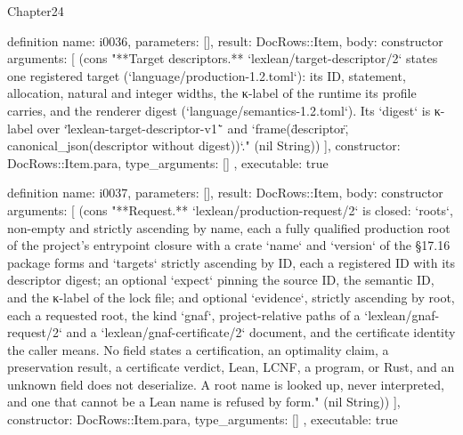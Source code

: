 \begin{lexlean}{Chapter24}
\begin{semanticmodule}
definition{
  name: i0036,
  parameters: [],
  result: DocRows::Item,
  body: constructor{
    arguments: [
      (cons "**Target descriptors.** `lexlean/target-descriptor/2` states one registered target (`language/production-1.2.toml`): its ID, statement, allocation, natural and integer widths, the κ-label of the runtime its profile carries, and the renderer digest (`language/semantics-1.2.toml`). Its `digest` is κ-label over `\"lexlean-target-descriptor-v1\"` and `frame(\"descriptor\", canonical_json(descriptor without digest))`." (nil String))
    ],
    constructor: DocRows::Item.para,
    type_arguments: []
  },
  executable: true
}

definition{
  name: i0037,
  parameters: [],
  result: DocRows::Item,
  body: constructor{
    arguments: [
      (cons "**Request.** `lexlean/production-request/2` is closed: `roots`, non-empty and strictly ascending by name, each a fully qualified production root of the project's entrypoint closure with a crate `name` and `version` of the §17.16 package forms and `targets` strictly ascending by ID, each a registered ID with its descriptor digest; an optional `expect` pinning the source ID, the semantic ID, and the κ-label of the lock file; and optional `evidence`, strictly ascending by root, each a requested root, the kind `gnaf`, project-relative paths of a `lexlean/gnaf-request/2` and a `lexlean/gnaf-certificate/2` document, and the certificate identity the caller means. No field states a certification, an optimality claim, a preservation result, a certificate verdict, Lean, LCNF, a program, or Rust, and an unknown field does not deserialize. A root name is looked up, never interpreted, and one that cannot be a Lean name is refused by form." (nil String))
    ],
    constructor: DocRows::Item.para,
    type_arguments: []
  },
  executable: true
}


\end{semanticmodule}
\end{lexlean}
